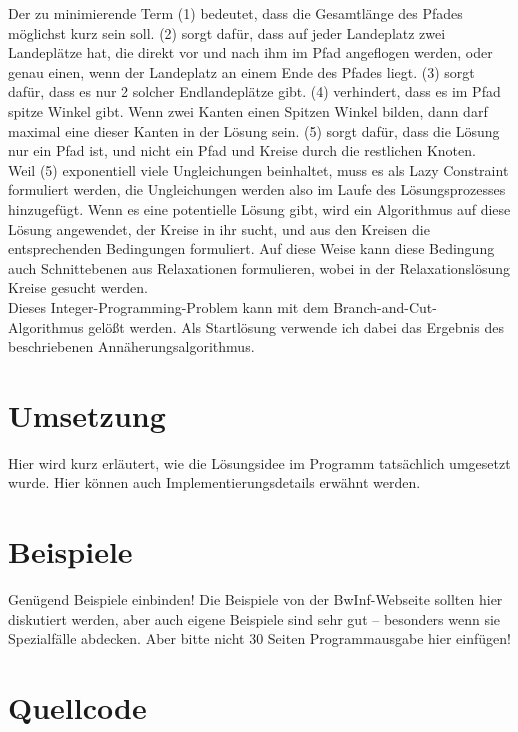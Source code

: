 \documentclass[a4paper,10pt,ngerman]{scrartcl}
\begin{document}
Der zu minimierende Term (1) bedeutet, dass die Gesamtlänge des Pfades möglichst kurz sein soll. (2) sorgt dafür, dass auf jeder Landeplatz
zwei Landeplätze hat, die direkt vor und nach ihm im Pfad angeflogen werden, oder genau einen, wenn der Landeplatz an einem Ende des Pfades liegt.
(3) sorgt dafür, dass es nur 2 solcher Endlandeplätze gibt. (4) verhindert, dass es im Pfad spitze Winkel gibt. Wenn zwei Kanten einen Spitzen
Winkel bilden, dann darf maximal eine dieser Kanten in der Lösung sein. (5) sorgt dafür, dass die Lösung nur ein Pfad ist, und nicht ein Pfad und
Kreise durch die restlichen Knoten. \\
Weil (5) exponentiell viele Ungleichungen beinhaltet, muss es als Lazy Constraint formuliert werden, die Ungleichungen werden also im Laufe des Lösungsprozesses
hinzugefügt. Wenn es
eine potentielle Lösung gibt, wird ein Algorithmus auf diese Lösung angewendet, der Kreise in ihr sucht, und aus den Kreisen die entsprechenden Bedingungen
formuliert. Auf diese Weise kann diese Bedingung auch Schnittebenen aus Relaxationen formulieren, wobei in der Relaxationslösung Kreise gesucht werden. \\
Dieses Integer-Programming-Problem kann mit dem Branch-and-Cut-Algorithmus gelößt werden. Als Startlösung verwende ich dabei das Ergebnis des beschriebenen
Annäherungsalgorithmus.
\section{Umsetzung}
Hier wird kurz erläutert, wie die Lösungsidee im Programm tatsächlich umgesetzt
wurde. Hier können auch Implementierungsdetails erwähnt werden.

\section{Beispiele}
Genügend Beispiele einbinden! Die Beispiele von der BwInf-Webseite sollten hier
diskutiert werden, aber auch eigene Beispiele sind sehr gut – besonders wenn
sie Spezialfälle abdecken. Aber bitte nicht 30 Seiten Programmausgabe hier
einfügen!

\section{Quellcode}

\begingroup
\def\chapter*#1{}

\endgroup
\end{document}
